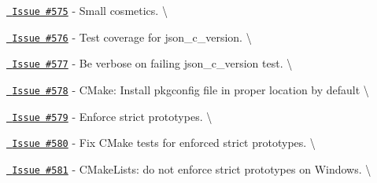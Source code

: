 \begin{DoxyItemize}
\item \href{https://github.com/json-c/json-c/issues/575}{\texttt{ Issue \#575}} -\/ Small cosmetics. \textbackslash{}
\item \href{https://github.com/json-c/json-c/issues/576}{\texttt{ Issue \#576}} -\/ Test coverage for json\+\_\+c\+\_\+version. \textbackslash{}
\item \href{https://github.com/json-c/json-c/issues/577}{\texttt{ Issue \#577}} -\/ Be verbose on failing json\+\_\+c\+\_\+version test. \textbackslash{}
\item \href{https://github.com/json-c/json-c/issues/578}{\texttt{ Issue \#578}} -\/ CMake\+: Install pkgconfig file in proper location by default \textbackslash{}
\item \href{https://github.com/json-c/json-c/issues/579}{\texttt{ Issue \#579}} -\/ Enforce strict prototypes. \textbackslash{}
\item \href{https://github.com/json-c/json-c/issues/580}{\texttt{ Issue \#580}} -\/ Fix CMake tests for enforced strict prototypes. \textbackslash{}
\item \href{https://github.com/json-c/json-c/issues/581}{\texttt{ Issue \#581}} -\/ CMake\+Lists\+: do not enforce strict prototypes on Windows. \textbackslash{} 
\end{DoxyItemize}